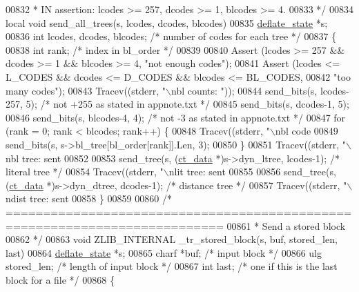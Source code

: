 \begin{DoxyCode}
{{{{{{{{{{{{{{00832 \textcolor{comment}{ * IN assertion: lcodes >= 257, dcodes >= 1, blcodes >= 4.}
00833 \textcolor{comment}{ */}
00834 local \textcolor{keywordtype}{void} send\_all\_trees(s, lcodes, dcodes, blcodes)
00835     \hyperlink{structinternal__state}{deflate\_state} *s;
00836     \textcolor{keywordtype}{int} lcodes, dcodes, blcodes; \textcolor{comment}{/* number of codes for each tree */}
00837 \{
00838     \textcolor{keywordtype}{int} rank;                    \textcolor{comment}{/* index in bl\_order */}
00839 
00840     Assert (lcodes >= 257 && dcodes >= 1 && blcodes >= 4, \textcolor{stringliteral}{"not enough codes"});
00841     Assert (lcodes <= L\_CODES && dcodes <= D\_CODES && blcodes <= BL\_CODES,
00842             \textcolor{stringliteral}{"too many codes"});
00843     Tracev((stderr, \textcolor{stringliteral}{"\(\backslash\)nbl counts: "}));
00844     send\_bits(s, lcodes-257, 5); \textcolor{comment}{/* not +255 as stated in appnote.txt */}
00845     send\_bits(s, dcodes-1,   5);
00846     send\_bits(s, blcodes-4,  4); \textcolor{comment}{/* not -3 as stated in appnote.txt */}
00847     \textcolor{keywordflow}{for} (rank = 0; rank < blcodes; rank++) \{
00848         Tracev((stderr, \textcolor{stringliteral}{"\(\backslash\)nbl code %
00849         send\_bits(s, s->bl\_tree[bl\_order[rank]].Len, 3);
00850     \}
00851     Tracev((stderr, \textcolor{stringliteral}{"\(\backslash\)nbl tree: sent %
00852 
00853     send\_tree(s, (\hyperlink{structct__data__s}{ct\_data} *)s->dyn\_ltree, lcodes-1); \textcolor{comment}{/* literal tree */}
00854     Tracev((stderr, \textcolor{stringliteral}{"\(\backslash\)nlit tree: sent %
00855 
00856     send\_tree(s, (\hyperlink{structct__data__s}{ct\_data} *)s->dyn\_dtree, dcodes-1); \textcolor{comment}{/* distance tree */}
00857     Tracev((stderr, \textcolor{stringliteral}{"\(\backslash\)ndist tree: sent %
00858 \}
00859 
00860 \textcolor{comment}{/* ===========================================================================}
00861 \textcolor{comment}{ * Send a stored block}
00862 \textcolor{comment}{ */}
00863 \textcolor{keywordtype}{void} ZLIB\_INTERNAL \_tr\_stored\_block(s, buf, stored\_len, last)
00864     \hyperlink{structinternal__state}{deflate\_state} *s;
00865     charf *buf;       \textcolor{comment}{/* input block */}
00866     ulg stored\_len;   \textcolor{comment}{/* length of input block */}
00867     \textcolor{keywordtype}{int} last;         \textcolor{comment}{/* one if this is the last block for a file */}
00868 \{
}}}}}}}}}}}}}}}}}}
\end{DoxyCode}
